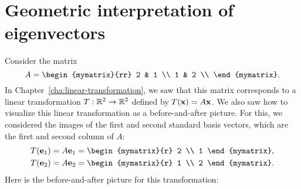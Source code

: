 \section{Geometric interpretation of eigenvectors}

Consider the matrix
\begin{equation*}
  A = \begin{mymatrix}{rr}
    2 & 1 \\
    1 & 2 \\
  \end{mymatrix}.
\end{equation*}
In Chapter~\ref{cha:linear-transformation}, we saw that this matrix
corresponds to a linear transformation $T : \mathbb{R}^2\to\mathbb{R}^2$ defined by
$T(\mbox{\bf x}) = A\mbox{\bf x}$. We also saw how to visualize this linear
transformation as a before-and-after picture. For this, we
considered the images of the first and second standard basis vectors,
which are the first and second column of $A$:
\begin{align*}
  T(\vect{e}_1) &= A\vect{e}_1 = \begin{mymatrix}{r} 2 \\ 1 \end{mymatrix},\\
  T(\vect{e}_2) &= A\vect{e}_2 = \begin{mymatrix}{r} 1 \\ 2 \end{mymatrix}.
\end{align*}
Here is the before-and-after picture for this transformation:
\vspace{-2cm}
